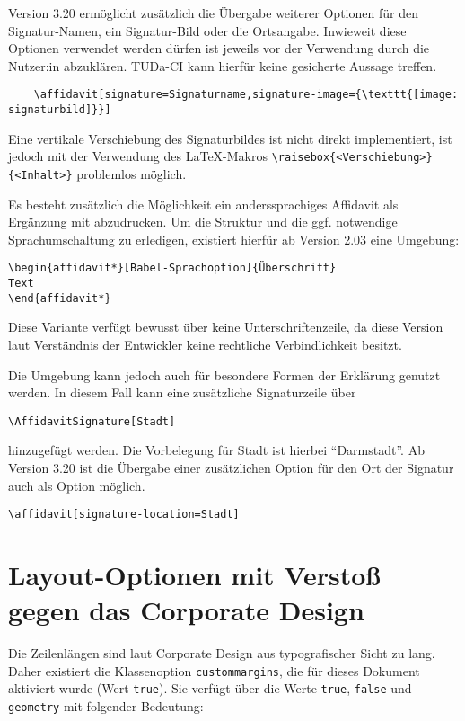 \documentclass[
	ngerman,
	ruledheaders=section,%
	class=report,%
	thesis={type=bachelor},%
	accentcolor=9c,%
	custommargins=true,%
	marginpar=false,%
	parskip=half-,%
	fontsize=11pt,%
]{tudapub}
\let\code\texttt
\begin{document}
Version 3.20 ermöglicht zusätzlich die Übergabe weiterer Optionen für den Signatur-Namen, ein Signatur-Bild oder die Ortsangabe.
Inwieweit diese Optionen verwendet werden dürfen ist jeweils vor der Verwendung durch die Nutzer:in abzuklären.
TUDa-CI kann hierfür keine gesicherte Aussage treffen.
\begin{verbatim}
	\affidavit[signature=Signaturname,signature-image={\texttt{[image: signaturbild]}}]
\end{verbatim}
Eine vertikale Verschiebung des Signaturbildes ist nicht direkt implementiert, ist jedoch mit der Verwendung des \LaTeX-Makros \verb+\raisebox{<Verschiebung>}{<Inhalt>}+ problemlos möglich.

Es besteht zusätzlich die Möglichkeit ein anderssprachiges Affidavit als Ergänzung mit abzudrucken. Um die Struktur und die ggf. notwendige Sprachumschaltung zu erledigen, existiert hierfür ab Version 2.03 eine Umgebung:

\begin{verbatim}
\begin{affidavit*}[Babel-Sprachoption]{Überschrift}
Text
\end{affidavit*}
\end{verbatim}

Diese Variante verfügt bewusst über keine Unterschriftenzeile, da diese Version laut Verständnis der Entwickler keine rechtliche Verbindlichkeit besitzt.

Die Umgebung kann jedoch auch für besondere Formen der Erklärung genutzt werden. In diesem Fall kann eine zusätzliche Signaturzeile über
\begin{verbatim}
\AffidavitSignature[Stadt]
\end{verbatim}
hinzugefügt werden. Die Vorbelegung für Stadt ist hierbei \enquote{Darmstadt}.
Ab Version 3.20 ist die Übergabe einer zusätzlichen Option für den Ort der Signatur auch als Option möglich.

\begin{verbatim}
\affidavit[signature-location=Stadt]
\end{verbatim}

\section{Layout-Optionen mit Verstoß gegen das Corporate Design}

Die Zeilenlängen sind laut Corporate Design aus typografischer Sicht zu lang.
Daher existiert die Klassenoption \code{custommargins}, die für dieses Dokument aktiviert wurde (Wert \code{true}). Sie verfügt über die Werte \code{true}, \code{false} und \code{geometry} mit folgender Bedeutung:
\end{document}
